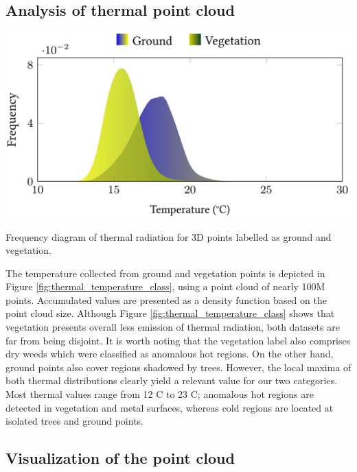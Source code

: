 \subsection{Analysis of thermal point cloud}

\begin{marginfigure}[1cm]
	\centering
	\includegraphics{figs/thermal_projection/temperature_class.png}
	\caption{Frequency diagram of thermal radiation for 3D points labelled as ground and vegetation.}
	\label{fig:thermal_temperature_class}
\end{marginfigure}
The temperature collected from ground and vegetation points is depicted in Figure \ref{fig:thermal_temperature_class}, using a point cloud of nearly 100M points. Accumulated values are presented as a density function based on the point cloud size. Although Figure \ref{fig:thermal_temperature_class} shows that vegetation presents overall less emission of thermal radiation, both datasets are far from being disjoint. It is worth noting that the vegetation label also comprises dry weeds which were classified as anomalous hot regions. On the other hand, ground points also cover regions shadowed by trees. However, the local maxima of both thermal distributions clearly yield a relevant value for our two categories. Most thermal values range from 12 \textdegree C to 23 \textdegree C; anomalous hot regions are detected in vegetation and metal surfaces, whereas cold regions are located at isolated trees and ground points.

\subsection{Visualization of the point cloud}

